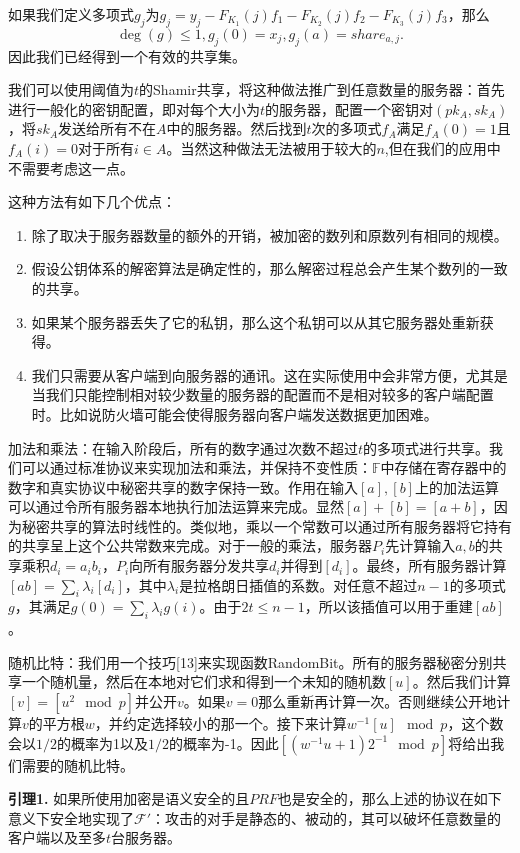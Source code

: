 如果我们定义多项式$g_j$为$g_j=y_j-F_{K_1}(j)f_1-F_{K_2}(j)f_2-F_{K_3}(j)f_3$，那么
$$\deg(g)\leq 1,g_j(0)=x_j,g_j(a)=share_{a,j}.$$
因此我们已经得到一个有效的共享集。

我们可以使用阈值为$t$的Shamir共享，将这种做法推广到任意数量的服务器：首先进行一般化的密钥配置，即对每个大小为$t$的服务器，配置一个密钥对$(pk_A,sk_A)$，将$sk_A$发送给所有不在$A$中的服务器。然后找到$t$次的多项式$f_A$满足$f_A(0)=1$且$f_A(i)=0$对于所有$i\in A$。当然这种做法无法被用于较大的$n$,但在我们的应用中不需要考虑这一点。

这种方法有如下几个优点：
\begin{enumerate}
	\item 除了取决于服务器数量的额外的开销，被加密的数列和原数列有相同的规模。
	\item 假设公钥体系的解密算法是确定性的，那么解密过程总会产生某个数列的一致的共享。
	\item 如果某个服务器丢失了它的私钥，那么这个私钥可以从其它服务器处重新获得。
	\item 我们只需要从客户端到向服务器的通讯。这在实际使用中会非常方便，尤其是当我们只能控制相对较少数量的服务器的配置而不是相对较多的客户端配置时。比如说防火墙可能会使得服务器向客户端发送数据更加困难。
\end{enumerate}

{\heiti 加法和乘法：}在输入阶段后，所有的数字通过次数不超过$t$的多项式进行共享。我们可以通过标准协议来实现加法和乘法，并保持不变性质：$\mathbb{F}$中存储在寄存器中的数字和真实协议中秘密共享的数字保持一致。作用在输入$[a],[b]$上的加法运算可以通过令所有服务器本地执行加法运算来完成。显然$[a]+[b]=[a+b]$，因为秘密共享的算法时线性的。类似地，乘以一个常数可以通过所有服务器将它持有的共享呈上这个公共常数来完成。对于一般的乘法，服务器$P_i$先计算输入$a,b$的共享乘积$d_i=a_ib_i$，$P_i$向所有服务器分发共享$d_i$并得到$[d_i]$。最终，所有服务器计算$[ab]=\sum_i \lambda_i[d_i]$，其中$\lambda_i$是拉格朗日插值的系数。对任意不超过$n-1$的多项式$g$，其满足$g(0)=\sum_i \lambda_ig(i)$。由于$2t\leq n-1$，所以该插值可以用于重建$[ab]$。

{\heiti 随机比特：}我们用一个技巧[13]来实现函数RandomBit。所有的服务器秘密分别共享一个随机量，然后在本地对它们求和得到一个未知的随机数$[u]$。然后我们计算$[v]=[u^2\mod p]$并公开$v$。如果$v=0$那么重新再计算一次。否则继续公开地计算$v$的平方根$w$，并约定选择较小的那一个。接下来计算$w^{-1}[u]\mod p$，这个数会以$1/2$的概率为1以及$1/2$的概率为-1。因此$[(w^{-1}u+1)2^{-1}\mod p]$将给出我们需要的随机比特。
\newline

\noindent\textbf{引理1.} 如果所使用加密是语义安全的且$PRF$也是安全的，那么上述的协议在如下意义下安全地实现了$\mathcal{F}'$：攻击的对手是静态的、被动的，其可以破坏任意数量的客户端以及至多$t$台服务器。

